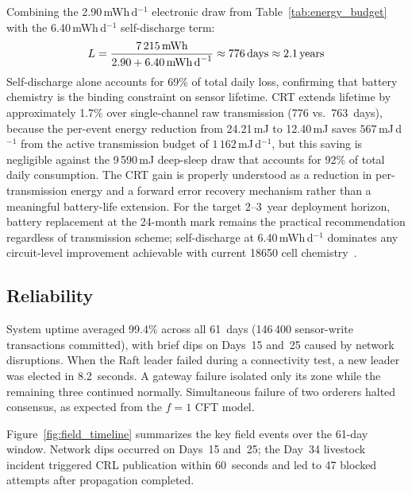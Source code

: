 \documentclass[a4paper,fleqn]{cas-dc}
\begin{document}
Combining the 2.90\,mWh\,d$^{-1}$ electronic draw from
Table~\ref{tab:energy_budget} with the 6.40\,mWh\,d$^{-1}$
self-discharge term:
\begin{equation}
L = \frac{7\,215\,\text{mWh}}{2.90 + 6.40\,\text{mWh\,d}^{-1}}
  \approx 776\,\text{days} \approx 2.1\,\text{years}
\label{eq:lifetime}
\end{equation}
Self-discharge alone accounts for 69\% of total daily loss,
confirming that battery chemistry is the binding constraint on sensor
lifetime. CRT extends lifetime by approximately 1.7\% over
single-channel raw transmission (776 vs.\ 763~days), because the
per-event energy reduction from 24.21\,mJ to 12.40\,mJ saves
$567$\,mJ\,d$^{-1}$ from the active transmission budget of
$1\,162$\,mJ\,d$^{-1}$, but this saving is negligible against the
9\,590\,mJ deep-sleep draw that accounts for 92\% of total daily
consumption. The CRT gain is properly understood as a
reduction in per-transmission energy and a forward error recovery
mechanism rather than a meaningful battery-life extension. For the
target 2--3~year deployment horizon, battery replacement at the
24-month mark remains the practical recommendation regardless of
transmission scheme; self-discharge at 6.40\,mWh\,d$^{-1}$ dominates
any circuit-level improvement achievable with current 18650 cell
chemistry~\cite{vetter2005ageing}.

\subsection{Reliability}
\label{subsec:reliability}

System uptime averaged 99.4\% across all 61~days (146\,400 sensor-write
transactions committed), with brief dips on Days~15 and~25 caused by
network disruptions. When the Raft leader failed during a connectivity
test, a new leader was elected in 8.2~seconds. A gateway failure
isolated only its zone while the remaining three continued normally.
Simultaneous failure of two orderers halted consensus, as expected
from the $f{=}1$ CFT model.

Figure~\ref{fig:field_timeline} summarizes the key field events over
the 61-day window. Network dips occurred on Days~15 and~25; the Day~34
livestock incident triggered CRL publication within 60~seconds and led
to 47 blocked attempts after propagation completed.
\end{document}

